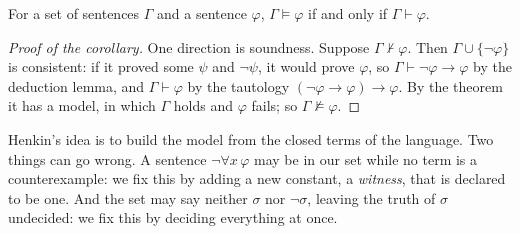 \begin{corollary}[completeness]\label{cor:completeness}
For a set of sentences $\Gamma$ and a sentence $\varphi$, $\Gamma\models\varphi$ if and only if $\Gamma\vdash\varphi$.
\end{corollary}

\begin{proof}[Proof of the corollary]
One direction is soundness. Suppose $\Gamma\nvdash\varphi$. Then $\Gamma\cup\{\neg\varphi\}$ is consistent: if it proved some $\psi$ and $\neg\psi$, it would prove $\varphi$, so $\Gamma\vdash\neg\varphi\to\varphi$ by the deduction lemma, and $\Gamma\vdash\varphi$ by the tautology $(\neg\varphi\to\varphi)\to\varphi$. By the theorem it has a model, in which $\Gamma$ holds and $\varphi$ fails; so $\Gamma\not\models\varphi$.
\end{proof}

Henkin's idea is to build the model from the closed terms of the language. Two things can go wrong. A sentence $\neg\forall x\,\varphi$ may be in our set while no term is a counterexample: we fix this by adding a new constant, a \emph{witness}, that is declared to be one. And the set may say neither $\sigma$ nor $\neg\sigma$, leaving the truth of $\sigma$ undecided: we fix this by deciding everything at once.

